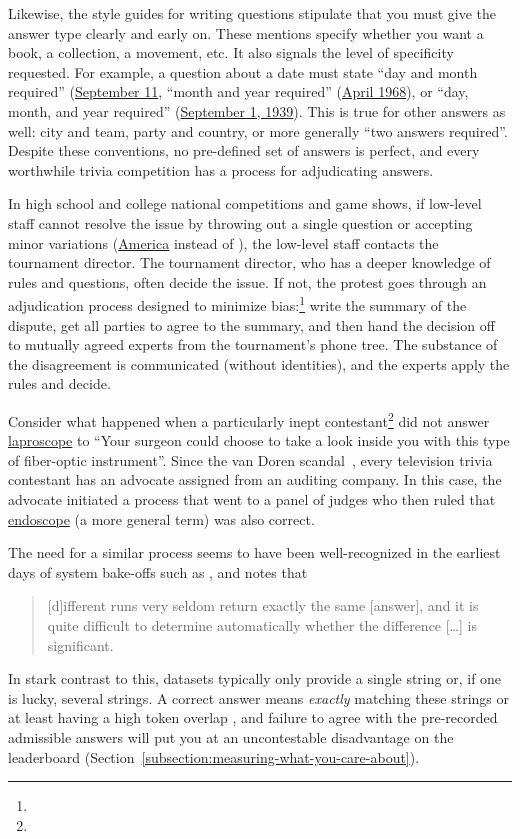 Likewise, the style guides for writing questions stipulate that you
must give the answer type clearly and early on.
These mentions specify whether you want a book, a collection, a movement, etc.  
It also signals the level of specificity requested.  
For example, a question about a date must state ``day and month required'' (\underline{September 11}, ``month and year required'' (\underline{April 1968}), or ``day, month, and year required'' (\underline{September 1, 1939}).
This is true for other answers as well: city and team, party and
country, or more generally ``two answers required''.
Despite these conventions, no pre-defined set of answers is perfect,
and every worthwhile trivia competition has a process for adjudicating
answers.

In high school and college national competitions and game shows,
if low-level staff cannot resolve the issue by throwing out a single
question or accepting minor variations (\underline{America} instead of
\underline{}), the low-level staff contacts the tournament
director.
The tournament director, who has a deeper knowledge of rules and questions, often decide the issue.
If not, the protest goes
through an adjudication process designed to minimize
bias:\footnote{}
write the summary of the dispute,
get all parties to agree to the summary,
and then hand the decision off to mutually agreed experts from the tournament's phone tree.
The substance of the disagreement is communicated (without identities), and the experts apply the rules and decide.

Consider what happened 
when a particularly inept \jeopardy{} contestant\footnote{} did not answer \underline{laproscope} to ``Your surgeon could choose to take a look inside you with this type of fiber-optic instrument''.
Since the van Doren scandal~\citep{freedman-97}, every television trivia contestant has an advocate assigned from an
auditing company.
In this case, the advocate initiated a process that went to a panel of judges who then
ruled that \underline{endoscope} (a more general term) was also correct.

The need for a similar process seems to have been well-recognized
in the earliest days of \qa{} system bake-offs such as , and \citet{voorhees-08} notes that
\begin{quote}
    [d]ifferent  runs very seldom return exactly the same [answer], and it is quite difficult to determine automatically whether the difference [\dots] is significant.
\end{quote} 
In stark contrast to this, \qa{} datasets typically only provide a single string or, if one is lucky,
several strings.  
A correct answer means \emph{exactly} matching these strings or at least
having a high token overlap \fone{}, and failure to agree with the
pre-recorded admissible answers will put you at an uncontestable
disadvantage on the leaderboard (Section~\ref{subsection:measuring-what-you-care-about}).  

